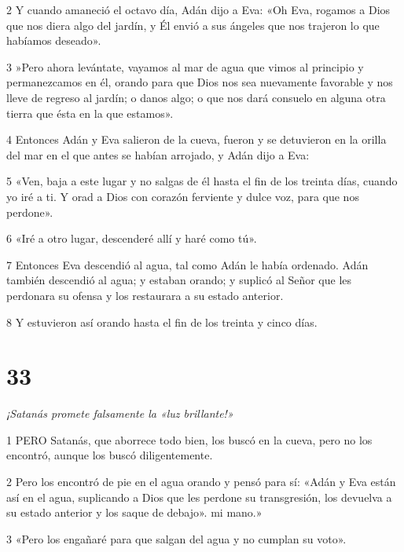 \par 2 Y cuando amaneció el octavo día, Adán dijo a Eva: «Oh Eva, rogamos a Dios que nos diera algo del jardín, y Él envió a sus ángeles que nos trajeron lo que habíamos deseado».

\par 3 »Pero ahora levántate, vayamos al mar de agua que vimos al principio y permanezcamos en él, orando para que Dios nos sea nuevamente favorable y nos lleve de regreso al jardín; o danos algo; o que nos dará consuelo en alguna otra tierra que ésta en la que estamos».

\par 4 Entonces Adán y Eva salieron de la cueva, fueron y se detuvieron en la orilla del mar en el que antes se habían arrojado, y Adán dijo a Eva:

\par 5 «Ven, baja a este lugar y no salgas de él hasta el fin de los treinta días, cuando yo iré a ti. Y orad a Dios con corazón ferviente y dulce voz, para que nos perdone».

\par 6 «Iré a otro lugar, descenderé allí y haré como tú».

\par 7 Entonces Eva descendió al agua, tal como Adán le había ordenado. Adán también descendió al agua; y estaban orando; y suplicó al Señor que les perdonara su ofensa y los restaurara a su estado anterior.

\par 8 Y estuvieron así orando hasta el fin de los treinta y cinco días.

\chapter{33}

\par \textit{¡Satanás promete falsamente la «luz brillante!»}

\par 1 PERO Satanás, que aborrece todo bien, los buscó en la cueva, pero no los encontró, aunque los buscó diligentemente.

\par 2 Pero los encontró de pie en el agua orando y pensó para sí: «Adán y Eva están así en el agua, suplicando a Dios que les perdone su transgresión, los devuelva a su estado anterior y los saque de debajo». mi mano.»

\par 3 «Pero los engañaré para que salgan del agua y no cumplan su voto».

